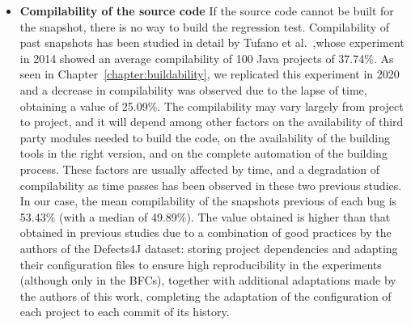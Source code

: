 \begin{itemize}
\item \textbf{Compilability of the source code} If the source code cannot be built for the snapshot, there is no way to build the regression test. 
Compilability of past snapshots has been studied in detail by Tufano et al.~\cite{tufano2017there},whose experiment in 2014 showed an average compilability of 100 Java projects of 37.74\%. 
As seen in Chapter~\ref{chapter:buildability}, we replicated this experiment in 2020 and a decrease in compilability was observed due to the lapse of time, 
obtaining a value of 25.09\%. The compilability may vary largely from project to project, and it will depend among other factors on the availability of third party modules needed to build the code, on the availability of the building tools in the right version, and on the complete automation of the building process. These factors are usually affected by time, and a degradation of compilability as time passes has been observed in these two previous studies.
In our case, the mean compilability of the snapshots previous of each bug is 53.43\% (with a median of 49.89\%). 
The value obtained is higher than that obtained in previous studies due to a combination of good practices by the authors of the Defects4J dataset:
storing project dependencies and adapting their configuration files to ensure high reproducibility in the experiments (although only in the BFCs), together with additional adaptations made by the authors of this work, completing the adaptation of the configuration of each project to each commit of its history.

\end{itemize}
